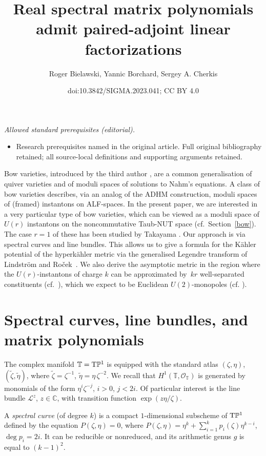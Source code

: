 \documentclass[10pt,a4paper]{amsart}
\title{Real spectral matrix polynomials admit paired-adjoint linear factorizations}
\author{Roger Bielawski, Yannic Borchard, Sergey A. Cherkis}
\date{doi:10.3842/SIGMA.2023.041; CC BY 4.0}
\newcommand{\cx}{{\mathbb C}}
\numberwithin{equation}{section}
\newcommand{\oP}{{\mathbb{P}}}
\newcommand{\oT}{{\mathbb{T}}}
\newcommand{\sO}{{\mathcal{O}}}
\begin{document}
\maketitle
\noindent\textit{Allowed standard prerequisites (editorial).}\begin{itemize}
\item Research prerequisites named in the original article. Full original bibliography retained; all source-local definitions and supporting arguments retained.
\end{itemize}\medskip
Bow varieties, introduced by the third author \cite{Che1,Che2}, are a common generalisation of quiver varieties and of moduli spaces of solutions to Nahm's equations.
A class of bow varieties describes, via an analog of the ADHM construction, moduli spaces of (framed) instantons on ALF-spaces.
In the present paper, we are interested in a very particular type of bow varieties, which can be viewed as a moduli space of $U(r)$ instantons on the {noncommutative} Taub-NUT space (cf.~Section~\ref{bow}). The case $r=1$ of these has been studied by Takayama
 \cite{Tak}. Our approach is via spectral curves and line bundles.
 This allows us to give a formula for the K\"ahler potential of the hyperk\"ahler metric via the generalised Legendre transform of Lindstr\"om and Ro\v{c}ek~\cite{LR}.
 We also derive the asymptotic metric in the region where the $U(r)$-instantons of charge $k$ can be approximated by~$kr$ well-separated constituents (cf.\ \cite[Section~9]{Che2}), which we expect to be Euclidean $U(2)$-monopoles (cf. \cite{FR}).

\section{Spectral curves, line bundles, and matrix polynomials}

The complex manifold $\oT={\rm T}\oP^1$ is equipped with the standard atlas $(\zeta,\eta)$, $(\tilde \zeta,\tilde\eta)$, where $\tilde\zeta=\zeta^{-1}$, $\tilde\eta=\eta\,\zeta^{-2}$. We recall \cite[Proposition~2.2]{AHH} that $H^1(\oT,\sO_\oT)$ is generated by monomials of the form $\eta^i\zeta^{-j}$, $i>0$, $j<2i$. Of particular interest is the line bundle $\mathscr{L}^z$, $z\in\cx$, with transition function $\exp(z\eta/\zeta)$.

A {\em spectral curve} (of degree $k$) is a compact $1$-dimensional subscheme of ${\rm T}\oP^1$ defined by the equation $P(\zeta,\eta)=0$, where $P(\zeta,\eta)=\eta^k+\sum_{i=1}^kp_i(\zeta)\eta^{k-i}$, $\deg p_i=2i$. It can be reducible or nonreduced, and its arithmetic genus $g$ is equal to $(k-1)^2$.
\end{document}
